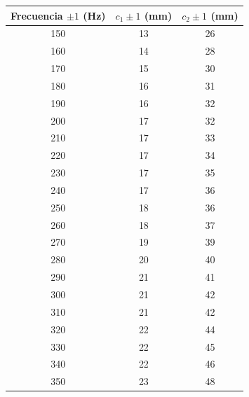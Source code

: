 \documentclass[a4paper,12pt,spanish]{article}
\begin{document}
	\begin{table}[H]
		\centering
		\begin{tabular}{|c|c|c|}
			\hline
			Frecuencia $\pm 1$ (Hz) & $c_1 \pm 1$ (mm) & $c_2 \pm 1$ (mm) \\ \hline\hline
			150                     & 13              & 26              \\ \hline
			160                     & 14              & 28              \\ \hline
			170                     & 15              & 30              \\ \hline
			180                     & 16              & 31              \\ \hline
			190                     & 16              & 32              \\ \hline
			200                     & 17              & 32              \\ \hline
			210                     & 17              & 33              \\ \hline
			220                     & 17              & 34              \\ \hline
			230                     & 17              & 35              \\ \hline
			240                     & 17              & 36              \\ \hline
			250                     & 18              & 36              \\ \hline
			260                     & 18              & 37              \\ \hline
			270                     & 19              & 39              \\ \hline
			280                     & 20              & 40              \\ \hline
			290                     & 21              & 41              \\ \hline
			300                     & 21              & 42              \\ \hline
			310                     & 21              & 42              \\ \hline
			320                     & 22              & 44              \\ \hline
			330                     & 22              & 45              \\ \hline
			340                     & 22              & 46              \\ \hline
			350                     & 23              & 48              \\ \hline

\end{tabular}
\end{table}
\end{document}
